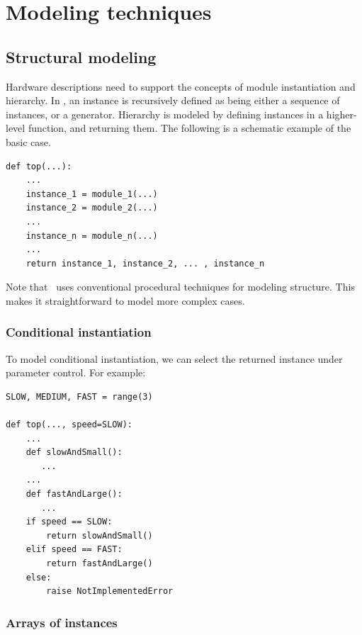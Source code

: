 \chapter{Modeling techniques \label{model}}

\section{Structural modeling \label{model-structure}}

Hardware descriptions need to support the concepts of module
instantiation and hierarchy.  In \myhdl{}, an instance is recursively
defined as being either a sequence of instances, or a generator.
Hierarchy is modeled by defining instances in a higher-level
function, and returning them.  The following is a schematic example
of the basic case.

\begin{verbatim}
def top(...):
    ...
    instance_1 = module_1(...)
    instance_2 = module_2(...)
    ...
    instance_n = module_n(...)
    ... 
    return instance_1, instance_2, ... , instance_n
\end{verbatim}

Note that \myhdl\ uses conventional procedural techniques
for modeling structure. This makes it straightforward
to model more complex cases.

\subsection{Conditional instantiation \label{model-conf}}

To model conditional instantiation, we can
select the returned instance under parameter control.
For example:

\begin{verbatim}
SLOW, MEDIUM, FAST = range(3)

def top(..., speed=SLOW):
    ...
    def slowAndSmall():
       ...
    ...
    def fastAndLarge():
       ...
    if speed == SLOW:
        return slowAndSmall()
    elif speed == FAST:
        return fastAndLarge()
    else:
        raise NotImplementedError
\end{verbatim}


\subsection{Arrays of instances \label{model-instarray}}

